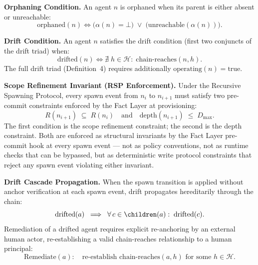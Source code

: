 \documentclass[12pt]{article}
\begin{document}
\medskip
\noindent\textbf{Orphaning Condition.}
An agent $n$ is orphaned when its parent is either absent or unreachable:
\begin{equation}
\text{orphaned}(n) \iff \bigl( \alpha(n) = \bot \bigr)\;\lor\;\bigl( \text{unreachable}(\alpha(n)) \bigr).
\label{eq:orphaned}
\end{equation}

\medskip
\noindent\textbf{Drift Condition.}
An agent $n$ satisfies the drift condition (first two conjuncts of the drift triad) when:
\begin{equation}
\text{drifted}(n) \iff \nexists\; h \in \mathcal{H}:\; \text{chain-reaches}(n, h).
\label{eq:drift-condition}
\end{equation}
The full drift triad (Definition~4) requires additionally $\text{operating}(n) = \text{true}$.

\medskip
\noindent\textbf{Scope Refinement Invariant (RSP Enforcement).}
Under the Recursive Spawning Protocol, every spawn event from $n_i$ to $n_{i+1}$ must satisfy two pre-commit constraints enforced by the Fact Layer at provisioning:
\begin{equation}
R(n_{i+1}) \;\subseteq\; R(n_i) \quad\text{and}\quad \text{depth}(n_{i+1}) \;\leq\; D_{\max}.
\label{eq:scope-refinement}
\end{equation}
The first condition is the scope refinement constraint; the second is the depth constraint. Both are enforced as structural invariants by the Fact Layer pre-commit hook at every spawn event — not as policy conventions, not as runtime checks that can be bypassed, but as deterministic write protocol constraints that reject any spawn event violating either invariant.

\medskip
\noindent\textbf{Drift Cascade Propagation.}
When the spawn transition is applied without anchor verification at each spawn event, drift propagates hereditarily through the chain:
\begin{equation}
\text{drifted}(a) \;\implies\; \forall\, c \in \children(a):\; \text{drifted}(c).
\label{eq:drift-propagation}
\end{equation}
Remediation of a drifted agent requires explicit re-anchoring by an external human actor, re-establishing a valid chain-reaches relationship to a human principal:
\begin{equation}
\text{Remediate}(a):\quad \text{re-establish }\text{chain-reaches}(a, h) \text{ for some } h \in \mathcal{H}.
\label{eq:drift-remediation}
\end{equation}
\end{document}
